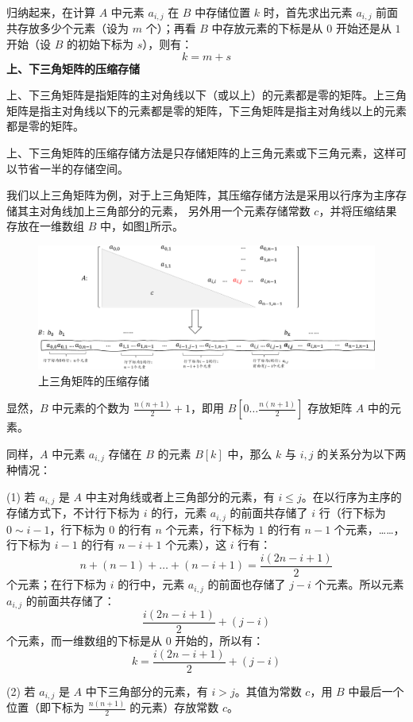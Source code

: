 \documentclass[lang=cn,newtx,10pt,scheme=chinese]{../elegantbook}
\begin{document}
归纳起来，在计算 $A$ 中元素 $a_{i,j}$ 在 $B$ 中存储位置 $k$ 时，首先求出元素 $a_{i,j}$ 前面共存放多少个元素（设为 $m$ 个）；再看 $B$ 中存放元素的下标是从 $0$ 开始还是从 $1$ 开始（设 $B$ 的初始下标为 $s$），则有：
\[
k = m + s
\]
\textbf{上、下三角矩阵的压缩存储}

上、下三角矩阵是指矩阵的主对角线以下（或以上）的元素都是零的矩阵。上三角矩阵是指主对角线以下的元素都是零的矩阵，下三角矩阵是指主对角线以上的元素都是零的矩阵。

上、下三角矩阵的压缩存储方法是只存储矩阵的上三角元素或下三角元素，这样可以节省一半的存储空间。

我们以上三角矩阵为例，对于上三角矩阵，其压缩存储方法是采用以行序为主序存储其主对角线加上三角部分的元素，
另外用一个元素存储常数 $c$，并将压缩结果存放在一维数组 $B$ 中，如图\ref{fig:upperMatrix}所示。

\begin{figure}[h]
  \centering
  \includegraphics[width=1\textwidth]{./figure/pdf/cropped/upperMatrix.pdf}
  \caption{上三角矩阵的压缩存储}
  \label{fig:upperMatrix}
\end{figure}
显然，$B$ 中元素的个数为 $\frac{n(n+1)}{2} + 1$，即用 $B[0 \dots \frac{n(n+1)}{2}]$ 存放矩阵 $A$ 中的元素。

同样，$A$ 中元素 $a_{i,j}$ 存储在 $B$ 的元素 $B[k]$ 中，那么 $k$ 与 $i,j$ 的关系分为以下两种情况：

(1) 若 $a_{i,j}$ 是 $A$ 中主对角线或者上三角部分的元素，有 $i \leq j$。在以行序为主序的存储方式下，不计行下标为 $i$ 的行，元素 $a_{i,j}$ 的前面共存储了 $i$ 行（行下标为 $0 \sim i-1$，行下标为 $0$ 的行有 $n$ 个元素，行下标为 $1$ 的行有 $n-1$ 个元素，……，行下标为 $i-1$ 的行有 $n-i+1$ 个元素），这 $i$ 行有：
\[
n + (n-1) + \dots + (n-i+1) = \frac{i(2n-i+1)}{2}
\]
个元素；在行下标为 $i$ 的行中，元素 $a_{i,j}$ 的前面也存储了 $j-i$ 个元素。所以元素 $a_{i,j}$ 的前面共存储了：
\[
\frac{i(2n-i+1)}{2} + (j-i)
\]
个元素，而一维数组的下标是从 $0$ 开始的，所以有：
\[
k = \frac{i(2n-i+1)}{2} + (j-i)
\]

(2) 若 $a_{i,j}$ 是 $A$ 中下三角部分的元素，有 $i > j$。其值为常数 $c$，用 $B$ 中最后一个位置（即下标为 $\frac{n(n+1)}{2}$ 的元素）存放常数 $c$。
\end{document}
